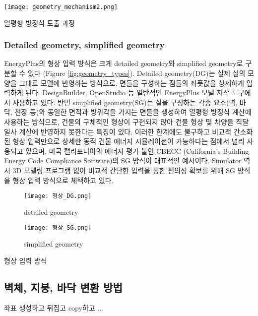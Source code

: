 \begin{defaultfigure}
  \texttt{[image: geometry\_mechanism2.png]}
  \caption{열평형 방정식 도출 과정}
  \label{fig:geometry_mechanism2}
\end{defaultfigure}

\subsubsection{Detailed geometry, simplified geometry}

EnergyPlus의 형상 입력 방식은 크게 detailed geometry와 simplified geometry로 구분할 수 있다 (Figure \ref{fig:geometry_types}). Detailed geometry(DG)는 실제 실의 모양을 그대로 모델에 반영하는 방식으로, 면들을 구성하는 점들의 좌푯값을 상세하게 입력하게 된다. DesignBuilder, OpenStudio 등 일반적인 EnergyPlus 모델 저작 도구에서 사용하고 있다. 반면 simplified geometry(SG)는 실을 구성하는 각종 요소(벽, 바닥, 천장 등)와 동일한 면적과 방위각을 가지는 면들을 생성하여 열평형 방정식 계산에 사용하는 방식으로, 건물의 구체적인 형상이 구현되지 않아 건물 형상 및 차양을 직달 일사 계산에 반영하지 못한다는 특징이 있다. 이러한 한계에도 불구하고 비교적 간소화된 형상 입력만으로 상세한 동적 건물 에너지 시뮬레이션이 가능하다는 점에서 널리 사용되고 있으며, 미국 캘리포니아의 에너지 평가 툴인 CBECC (California's Building Energy Code Compliance Software)의 SG 방식\cite{cbecc}이 대표적인 예시이다. Simulator 역시 3D 모델링 프로그램 없이 비교적 간단한 입력을 통한 편의성 확보를 위해 SG 방식을 형상 입력 방식으로 체택하고 있다.

\begin{defaultfigure}
  
  \begin{subfigure}[b]{0.45\textwidth}
    \centering
    \texttt{[image: 형상\_DG.png]}
    \caption{detailed geometry}
  \end{subfigure}
  \hfill
  \begin{subfigure}[b]{0.45\textwidth}
    \centering
    \texttt{[image: 형상\_SG.png]}
    \caption{simplified geometry}
  \end{subfigure}
  
  \caption{형상 입력 방식}
  \label{fig:geometry_types}

\end{defaultfigure}

\subsection{벽체, 지붕, 바닥 변환 방법}
좌표 생성하고 뒤집고 copy하고 ...

